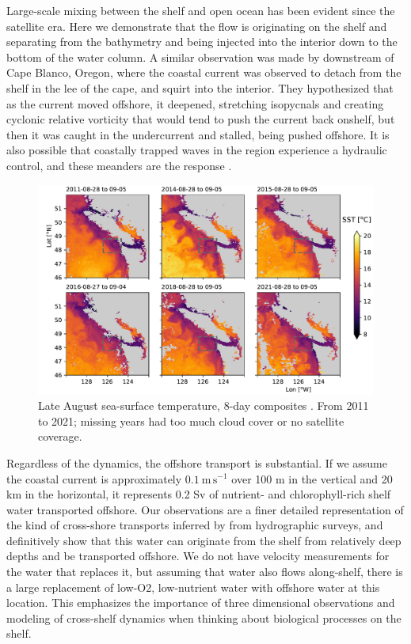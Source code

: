 \documentclass[draft]{agujournal2019}
\begin{document}
Large-scale mixing between the shelf and open ocean has been evident since the satellite era.  Here we demonstrate that the flow is originating on the shelf and separating from the bathymetry and being injected into the interior down to the bottom of the water column.  A  similar observation was made by  downstream of Cape Blanco, Oregon, where the coastal current was observed to detach from the shelf in the lee of the cape, and squirt into the interior.  They hypothesized that as the current moved offshore, it deepened, stretching isopycnals and creating cyclonic relative vorticity that would tend to push the current back onshelf, but then it was caught in the undercurrent and stalled, being pushed offshore. It is also possible that coastally trapped waves in the region experience a hydraulic control, and these meanders are the response \cite{dalebarth01}.


\begin{figure}[htbp]
  \begin{center}
    \includegraphics[width=6in]{SSTLateAug}
    \caption{
      Late August sea-surface temperature, 8-day composites \cite{MODISSST8d}.   From 2011 to 2021; missing years had too much cloud cover or no satellite coverage.
      \label{fig:SSTLateAug} }
  \end{center}
\end{figure}

Regardless of the dynamics, the offshore transport is substantial.  If we assume the coastal current is approximately $0.1\ \mathrm{m\,s^{-1}}$ over 100 m in the vertical and 20 km in the horizontal, it represents 0.2 Sv of nutrient- and chlorophyll-rich shelf water transported offshore.  Our observations are a finer detailed representation of the kind of cross-shore transports inferred by  from hydrographic surveys, and definitively show that this water can originate from the shelf from relatively deep depths and be transported offshore.  We do not have velocity measurements for the water that replaces it, but assuming that water also flows along-shelf, there is a large replacement of low-O2, low-nutrient water with offshore water at this location.  This emphasizes the importance of three dimensional observations and modeling of cross-shelf dynamics when thinking about biological processes on the shelf.
\end{document}

